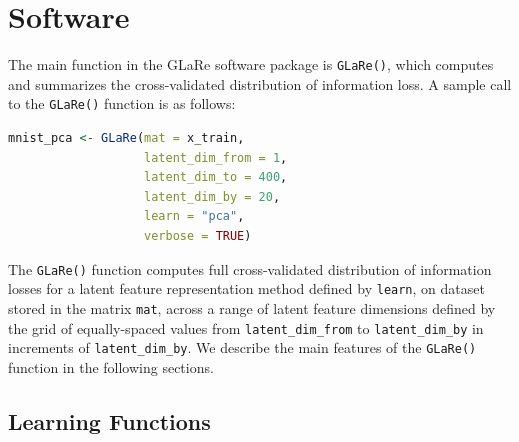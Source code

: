\section{Software}\label{sec:software}

The main function in the GLaRe software package is \texttt{GLaRe()}, which computes and summarizes the cross-validated distribution of information loss.
A sample call to the \texttt{GLaRe()} function is as follows:
\begin{lstlisting}[language=R]
mnist_pca <- GLaRe(mat = x_train,
                   latent_dim_from = 1,
                   latent_dim_to = 400,
                   latent_dim_by = 20,
                   learn = "pca",
                   verbose = TRUE)
\end{lstlisting}
The \texttt{GLaRe()} function computes full cross-validated distribution of information losses for a latent feature representation method defined by \texttt{learn}, on dataset stored in the matrix \texttt{mat}, across a range of latent feature dimensions defined by the grid of equally-spaced values from \texttt{latent\_dim\_from} to \texttt{latent\_dim\_by} in increments of \texttt{latent\_dim\_by}.
We describe the main features of the \texttt{GLaRe()} function in the following sections.

\subsection{Learning Functions}\label{sec:learning-functions}

